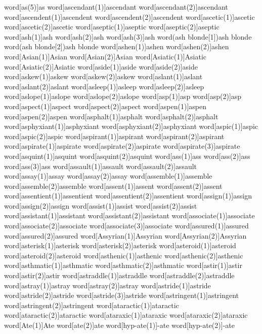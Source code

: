word[as(5)]{as}
word[ascendant(1)]{ascendant}
word[ascendant(2)]{ascendant}
word[ascendent(1)]{ascendent}
word[ascendent(2)]{ascendent}
word[ascetic(1)]{ascetic}
word[ascetic(2)]{ascetic}
word[aseptic(1)]{aseptic}
word[aseptic(2)]{aseptic}
word[ash(1)]{ash}
word[ash(2)]{ash}
word[ash(3)]{ash}
word(ash blonde[1]){ash blonde}
word(ash blonde[2]){ash blonde}
word[ashen(1)]{ashen}
word[ashen(2)]{ashen}
word[Asian(1)]{Asian}
word[Asian(2)]{Asian}
word[Asiatic(1)]{Asiatic}
word[Asiatic(2)]{Asiatic}
word[aside(1)]{aside}
word[aside(2)]{aside}
word[askew(1)]{askew}
word[askew(2)]{askew}
word[aslant(1)]{aslant}
word[aslant(2)]{aslant}
word[asleep(1)]{asleep}
word[asleep(2)]{asleep}
word[aslope(1)]{aslope}
word[aslope(2)]{aslope}
word[asp(1)]{asp}
word[asp(2)]{asp}
word[aspect(1)]{aspect}
word[aspect(2)]{aspect}
word[aspen(1)]{aspen}
word[aspen(2)]{aspen}
word[asphalt(1)]{asphalt}
word[asphalt(2)]{asphalt}
word[asphyxiant(1)]{asphyxiant}
word[asphyxiant(2)]{asphyxiant}
word[aspic(1)]{aspic}
word[aspic(2)]{aspic}
word[aspirant(1)]{aspirant}
word[aspirant(2)]{aspirant}
word[aspirate(1)]{aspirate}
word[aspirate(2)]{aspirate}
word[aspirate(3)]{aspirate}
word[asquint(1)]{asquint}
word[asquint(2)]{asquint}
word[ass(1)]{ass}
word[ass(2)]{ass}
word[ass(3)]{ass}
word[assault(1)]{assault}
word[assault(2)]{assault}
word[assay(1)]{assay}
word[assay(2)]{assay}
word[assemble(1)]{assemble}
word[assemble(2)]{assemble}
word[assent(1)]{assent}
word[assent(2)]{assent}
word[assentient(1)]{assentient}
word[assentient(2)]{assentient}
word[assign(1)]{assign}
word[assign(2)]{assign}
word[assist(1)]{assist}
word[assist(2)]{assist}
word[assistant(1)]{assistant}
word[assistant(2)]{assistant}
word[associate(1)]{associate}
word[associate(2)]{associate}
word[associate(3)]{associate}
word[assured(1)]{assured}
word[assured(2)]{assured}
word[Assyrian(1)]{Assyrian}
word[Assyrian(2)]{Assyrian}
word[asterisk(1)]{asterisk}
word[asterisk(2)]{asterisk}
word[asteroid(1)]{asteroid}
word[asteroid(2)]{asteroid}
word[asthenic(1)]{asthenic}
word[asthenic(2)]{asthenic}
word[asthmatic(1)]{asthmatic}
word[asthmatic(2)]{asthmatic}
word[astir(1)]{astir}
word[astir(2)]{astir}
word[astraddle(1)]{astraddle}
word[astraddle(2)]{astraddle}
word[astray(1)]{astray}
word[astray(2)]{astray}
word[astride(1)]{astride}
word[astride(2)]{astride}
word[astride(3)]{astride}
word[astringent(1)]{astringent}
word[astringent(2)]{astringent}
word[ataractic(1)]{ataractic}
word[ataractic(2)]{ataractic}
word[ataraxic(1)]{ataraxic}
word[ataraxic(2)]{ataraxic}
word[Ate(1)]{Ate}
word[ate(2)]{ate}
word[hyp-ate(1)]{-ate}
word[hyp-ate(2)]{-ate}
